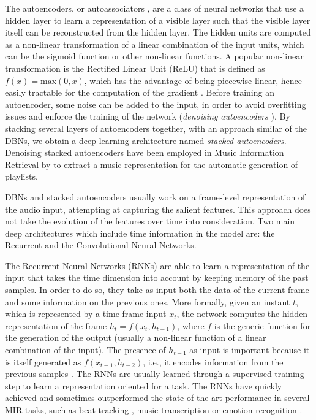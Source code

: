 The autoencoders, or autoassociators \cite{Bengio2009}, are a class of neural networks that use a hidden layer to learn a representation of a visible layer such that the visible layer itself can be reconstructed from the hidden layer. The hidden units are computed as a non-linear transformation of a linear combination of the input units, which can be the sigmoid function or other non-linear functions. A popular non-linear transformation is the Rectified Linear Unit (ReLU) that is defined as $f(x)=\text{max}(0,x)$, which has the advantage of being piecewise linear, hence easily tractable for the computation of the gradient \cite{Zeiler2013}. Before training an autoencoder, some noise can be added to the input, in order to avoid overfitting issues and enforce the training of the network (\textit{denoising autoencoders} \cite{vincent2008extracting}). By stacking several layers of autoencoders together, with an approach similar of the DBNs, we obtain a deep learning architecture named \textit{stacked autoencoders}. Denoising stacked autoencoders have been employed in Music Information Retrieval by \cite{maillet2009steerable} to extract a music representation for the automatic generation of playlists.

DBNs and stacked autoencoders usually work on a frame-level representation of the audio input, attempting at capturing the salient features. This approach does not take the evolution of the features over time into consideration. Two main deep architectures which include time information in the model are: the Recurrent and the Convolutional Neural Networks.

The Recurrent Neural Networks (RNNs) are able to learn a representation of the input that takes the time dimension into account by keeping memory of the past samples. In order to do so, they take as input both the data of the current frame and some information on the previous ones. More formally, given an instant $t$, which is represented by a time-frame input $x_t$, the network computes the hidden representation of the frame $h_t=f(x_t, h_{t-1})$, where $f$ is the generic function for the generation of the output (usually a non-linear function of a linear combination of the input). The presence of $h_{t-1}$ as input is important because it is itself generated as $f(x_{t-1}, h_{t-2})$, i.e., it encodes information from the previous samples \cite{mesnil2013investigation}. The RNNs are usually learned through a supervised training step to learn a representation oriented for a task. The RNNs have quickly achieved and sometimes outperformed the state-of-the-art performance in several MIR tasks, such as beat tracking \cite{bock2014multi}, music transcription \cite{sigtia2016end} or emotion recognition \cite{Weninger2014}.

